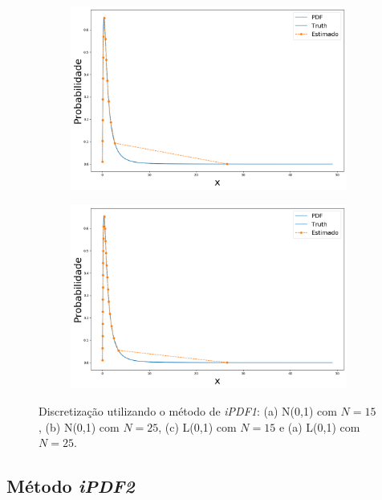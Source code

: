 \begin{figure}[H]
	\begin{subfigure}[b]{0.45\textwidth}
		\centering 
		\includegraphics[width=\linewidth]{./figuras/iPDF1_lognormal_15}
		\caption{}
		\label{fig:ipdflognorm15}
	\end{subfigure}
	\hfill
	\begin{subfigure}[b]{0.45\textwidth}
		\centering 
		\includegraphics[width=\linewidth]{./figuras/iPDF1_lognormal_25}
		\caption{}
		\label{fig:ipdflognorm25}
	\end{subfigure}
	
	\caption{Discretização utilizando o método de \textit{iPDF1}: (a) N(0,1) com $N = 15$, (b) N(0,1) com $N = 25$, (c) L(0,1) com $N = 15$ e (a) L(0,1) com $N = 25$.}
	\label{fig:ipdfmnorm}
\end{figure}



\subsection{Método \textit{iPDF2}}

